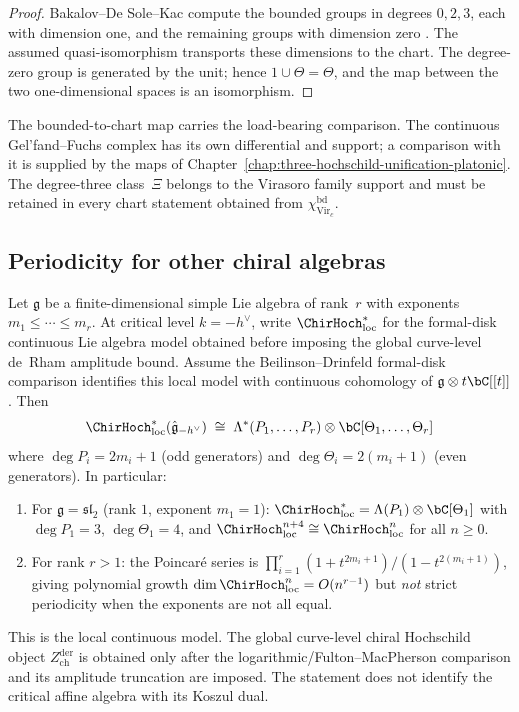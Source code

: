 \begin{proof}
Bakalov--De Sole--Kac compute the bounded groups in degrees
$0,2,3$, each with dimension one, and the remaining groups with
dimension zero \cite[Theorem~7.2]{BDSK21}.  The assumed
quasi-isomorphism transports these dimensions to the chart.  The
degree-zero group is generated by the unit; hence
$1\cup\Theta=\Theta$, and the map between the two one-dimensional
spaces is an isomorphism.
\end{proof}

\begin{remark}[Scope]
The bounded-to-chart map carries the load-bearing comparison.  The
continuous Gel'fand--Fuchs complex has its own differential and
support; a comparison with it is supplied by the maps of
Chapter~\ref{chap:three-hochschild-unification-platonic}.  The
degree-three class~$\Xi$ belongs to the Virasoro family support and
must be retained in every chart statement obtained from
$\chi_{\operatorname{Vir}_c}^{\mathrm{bd}}$.
\end{remark}

\subsection{Periodicity for other chiral algebras}

\begin{theorem}
\label{thm:affine-periodicity-critical}
Let $\mathfrak{g}$ be a finite-dimensional simple Lie algebra of rank~$r$
with exponents $m_1 \leq \cdots \leq m_r$.
At critical level $k = -h^{\vee}$, write
$\ChirHoch_{\mathrm{loc}}^*$ for the formal-disk continuous Lie
algebra model obtained before imposing the global curve-level
de~Rham amplitude bound.  Assume the Beilinson--Drinfeld
formal-disk comparison identifies this local model with
continuous cohomology of $\mathfrak g\otimes t\bC[[t]]$.  Then
\[
\ChirHoch_{\mathrm{loc}}^*(\hat{\mathfrak{g}}_{-h^{\vee}}) \;\cong\;
\Lambda^*(P_1, \ldots, P_r) \otimes \bC[\Theta_1, \ldots, \Theta_r]
\]
where $\deg P_i = 2m_i + 1$ (odd generators) and $\deg\Theta_i = 2(m_i + 1)$
(even generators). In particular:
\begin{enumerate}
\item For $\mathfrak{g} = \mathfrak{sl}_2$ (rank $1$, exponent $m_1 = 1$):
$\ChirHoch_{\mathrm{loc}}^* = \Lambda(P_1) \otimes \bC[\Theta_1]$
with $\deg P_1 = 3$, $\deg\Theta_1 = 4$, and
$\ChirHoch_{\mathrm{loc}}^{n+4} \cong
\ChirHoch_{\mathrm{loc}}^n$ for all $n \geq 0$.
\item For rank $r > 1$: the Poincar\'e series is
$\prod_{i=1}^r (1 + t^{2m_i+1})/(1-t^{2(m_i+1)})$, giving polynomial
growth $\dim \ChirHoch_{\mathrm{loc}}^n = O(n^{r-1})$ but
\emph{not} strict periodicity when the exponents are not all equal.
\end{enumerate}
This is the local continuous model.  The global curve-level chiral
Hochschild object $Z^{\mathrm{der}}_{\mathrm{ch}}$ is obtained only
after the logarithmic/Fulton--MacPherson comparison and its amplitude
truncation are imposed.  The statement does not identify the
critical affine algebra with its Koszul dual.
\end{theorem}

